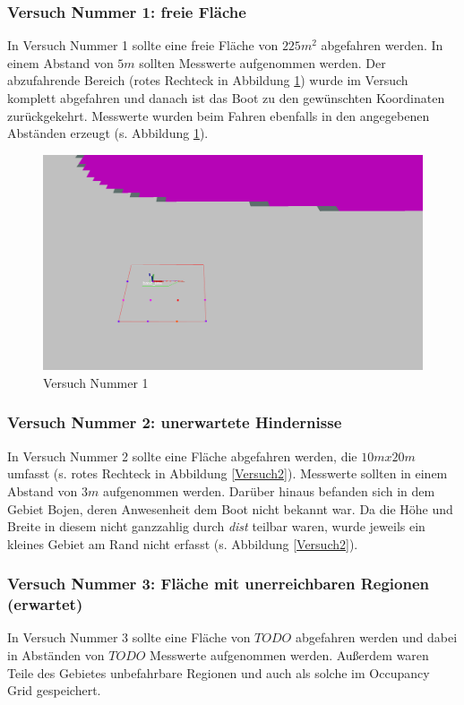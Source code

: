\documentclass[11pt]{article}
\begin{document}
\subsubsection{Versuch Nummer 1: freie Fläche}
In Versuch Nummer 1 sollte eine freie Fläche von $225m^2$ abgefahren werden. In einem Abstand von $5m$ sollten Messwerte aufgenommen werden. Der abzufahrende Bereich (rotes Rechteck in Abbildung \ref{Versuch1}) wurde im Versuch komplett abgefahren und danach ist das Boot zu den gewünschten Koordinaten zurückgekehrt. Messwerte wurden beim Fahren ebenfalls in den angegebenen Abständen erzeugt (s. Abbildung \ref{Versuch1}).

\begin{figure}[h]
	\centering
	\includegraphics[width=0.8\linewidth]{versuch1.png}
	\caption{Versuch Nummer 1}
	\label{Versuch1}
\end{figure}

\subsubsection{Versuch Nummer 2: unerwartete Hindernisse}
In Versuch Nummer 2 sollte eine Fläche abgefahren werden, die $10mx20m$ umfasst (s. rotes Rechteck in Abbildung \ref{Versuch2}). Messwerte sollten in einem Abstand von $3m$ aufgenommen werden. Darüber hinaus befanden sich in dem Gebiet Bojen, deren Anwesenheit dem Boot nicht bekannt war. Da die Höhe und Breite in diesem nicht ganzzahlig durch \textit{dist} teilbar waren, wurde jeweils ein kleines Gebiet am Rand nicht erfasst (s. Abbildung \ref{Versuch2}).

\subsubsection{Versuch Nummer 3: Fläche mit unerreichbaren Regionen (erwartet)}
In Versuch Nummer 3 sollte eine Fläche von $TODO$ abgefahren werden und dabei in Abständen von $TODO$ Messwerte aufgenommen werden. Außerdem waren Teile des Gebietes unbefahrbare Regionen und auch als solche im Occupancy Grid gespeichert.
\end{document}
